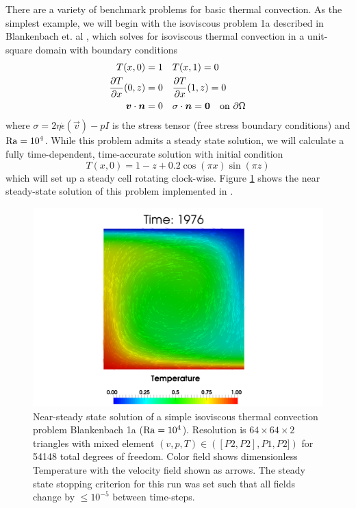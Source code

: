 There are a variety of benchmark problems for basic thermal
convection. As the simplest example, we will begin with the isoviscous
problem 1a described in Blankenbach et. al
\cite{blankenbach_benchmark_1989}, which solves for isoviscous thermal
convection in a unit-square domain with boundary conditions
\begin{align}
  \label{eq:rbconvBCs}
  T(x,0) = 1 &  \quad T(x,1) = 0\\
  \frac{\partial T}{\partial x}(0,z)=0 &  \quad\frac{\partial T}{\partial x}(1,z)=0\\
  {\mbox{\boldmath$v$}}\cdot{\mbox{\boldmath$n$}} = 0 & \quad \sigma\cdot{\mbox{\boldmath$n$}}= {\mbox{\boldmath$0$}} \quad\text{on } \partial\Omega 
\end{align}
where $\sigma = 2\eta \dot{\epsilon}(\vec{v})-pI$ is the stress tensor
(free stress boundary conditions) %
and $\mathrm{Ra}=10^{4}$.  While this problem admits a steady state solution,
we will calculate a fully time-dependent, time-accurate solution with
initial condition
\begin{displaymath}
  T(x,0) = 1 - z + 0.2\cos(\pi x)\sin(\pi z)
\end{displaymath}
which will set up a steady cell rotating clock-wise. Figure
\ref{fig:convection1a} shows the near steady-state solution of this
problem implemented in \TF.

\begin{figure}[htbp!]
  \centering
  \includegraphics[width=.9\textwidth]{figures/convection_isoviscous_TV.png}
  \caption{Near-steady state solution of a simple isoviscous thermal
    convection problem Blankenbach 1a
    \cite{blankenbach_benchmark_1989} ($\mathrm{Ra}=10^{4}$). Resolution is
    $64\times64\times2$ triangles with mixed element
    $(v,p,T)\in([P2,P2],P1,P2])$ for 54148 total degrees of freedom.  Color field
    shows dimensionless Temperature with the velocity field shown as
    arrows. The steady state stopping criterion for this run was set
    such that all fields change by $\leq10^{-5}$ between time-steps.}
  \label{fig:convection1a}
\end{figure}

